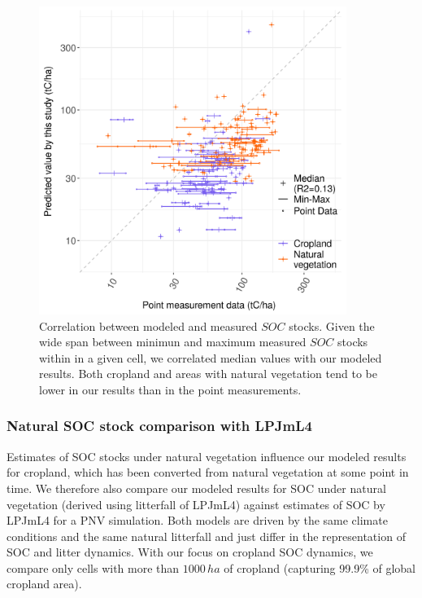 \documentclass[gc, manuscript]{copernicus}
\begin{document}
\begin{figure}[h]
\includegraphics[width=10cm]{../ResultNotebooks/Output/Images/scatterComparePointData_2010} \caption{Correlation between modeled and measured $SOC$ stocks. Given the wide span between minimun and maximum measured $SOC$ stocks within in a given cell, we correlated median values with our modeled results. Both cropland and areas with natural vegetation tend to be lower in our results than in the point measurements.}\label{fig:SOCpoint}
\end{figure}

\hypertarget{natural-soc-stock-comparison-with-lpjml4}{%
\subsubsection{Natural SOC stock comparison with LPJmL4}\label{natural-soc-stock-comparison-with-lpjml4}}

Estimates of SOC stocks under natural vegetation influence our modeled results for cropland, which has been converted from natural vegetation at some point in time. We therefore also compare our modeled results for SOC under natural vegetation (derived using litterfall of LPJmL4) against estimates of SOC by LPJmL4 for a PNV simulation. Both models are driven by the same climate conditions and the same natural litterfall and just differ in the representation of SOC and litter dynamics. With our focus on cropland SOC dynamics, we compare only cells with more than \(1000\,\unit{ha}\) of cropland (capturing 99.9\% of global cropland area).
\end{document}
